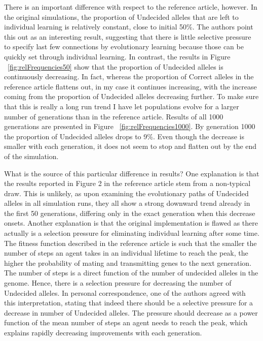 \documentclass[10pt,a4paper,onecolumn]{article}
\begin{document}
There is an important difference with respect to the reference article,
however. In the original simulations, the proportion of Undecided
alleles that are left to individual learning is relatively constant,
close to initial 50\%. The authors point this out as an interesting
result, suggesting that there is little selective pressure to specify
last few connections by evolutionary learning because those can be
quickly set through individual learning. In contrast, the results in
Figure ~\ref{fig:relFrequencies50} show that the proportion of Undecided
alleles is continuously decreasing. In fact, whereas the proportion of
Correct alleles in the reference article flattens out, in my case it
continues increasing, with the increase coming from the proportion of
Undecided alleles decreasing further. To make sure that this is really a
long run trend I have let populations evolve for a larger number of
generations than in the reference article. Results of all 1000
generations are presented in Figure ~\ref{fig:relFrequencies1000}. By
generation 1000 the proportion of Undecided alleles drops to 9\%. Even
though the decrease is smaller with each generation, it does not seem to
stop and flatten out by the end of the simulation.

What is the source of this particular difference in results? One
explanation is that the results reported in Figure 2 in the reference
article stem from a non-typical draw. This is unlikely, as upon
examining the evolutionary paths of Undecided alleles in all simulation
runs, they all show a strong downward trend already in the first 50
generations, differing only in the exact generation when this decrease
onsets. Another explanation is that the original implementation is
flawed as there actually is a selection pressure for eliminating
individual learning after some time. The fitness function described in
the reference article is such that the smaller the number of steps an
agent takes in an individual lifetime to reach the peak, the higher the
probability of mating and transmitting genes to the next generation. The
number of steps is a direct function of the number of undecided alleles
in the genome. Hence, there is a selection pressure for decreasing the
number of Undecided alleles. In personal correspondence, one of the
authors agreed with this interpretation, stating that indeed there
should be a selective pressure for a decrease in number of Undecided
alleles. The pressure should decrease as a power function of the mean
number of steps an agent needs to reach the peak, which explains rapidly
decreasing improvements with each generation.
\end{document}
